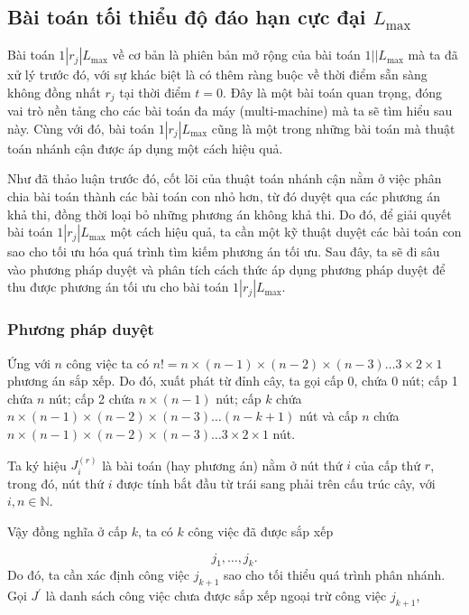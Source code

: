 \subsection{Bài toán tối thiểu độ đáo hạn cực đại $L_{\max}$}

Bài toán $1|r_j|L_{\max}$ về cơ bản là phiên bản mở rộng của bài toán $1||L_{\max}$ mà ta đã xử lý trước đó, với sự khác biệt là có thêm ràng buộc về thời điểm sẵn sàng không đồng nhất $r_j$ tại thời điểm $t=0$. Đây là một bài toán quan trọng, đóng vai trò nền tảng cho các bài toán đa máy (multi-machine) mà ta sẽ tìm hiểu sau này. Cùng với đó, bài toán $1|r_j|L_{\max}$ cũng là một trong những bài toán mà thuật toán nhánh cận được áp dụng một cách hiệu quả.

Như đã thảo luận trước đó, cốt lõi của thuật toán nhánh cận nằm ở việc phân chia bài toán thành các bài toán con nhỏ hơn, từ đó duyệt qua các phương án khả thi, đồng thời loại bỏ những phương án không khả thi. Do đó, để giải quyết bài toán $1|r_j|L_{\max}$ một cách hiệu quả, ta cần một kỹ thuật duyệt các bài toán con sao cho tối ưu hóa quá trình tìm kiếm phương án tối ưu. Sau đây, ta sẽ đi sâu vào phương pháp duyệt và phân tích cách thức áp dụng phương pháp duyệt để thu được phương án tối ưu cho bài toán $1|r_j|L_{\max}$.

\subsubsection*{Phương pháp duyệt}

Ứng với $n$ công việc ta có $n! = n \times (n-1) \times (n-2) \times (n-3) \ldots 3 \times 2 \times 1$ phương án sắp xếp. Do đó, xuất phát từ đỉnh cây, ta gọi cấp 0, chứa 0 nút; cấp 1 chứa $n$ nút; cấp 2 chứa $n \times (n-1)$ nút; cấp $k$ chứa $n \times (n-1) \times (n-2) \times (n-3) \ldots (n-k+1)$ nút và cấp $n$ chứa $n \times (n-1) \times (n-2) \times (n-3) \ldots 3 \times 2 \times 1$ nút.

\begin{cy}
Ta ký hiệu $J_i^{(r)}$ là bài toán (hay phương án) nằm ở nút thứ $i$ của cấp thứ $r$, trong đó, nút thứ $i$ được tính bắt đầu từ trái sang phải trên cấu trúc cây, với $i, n \in \mathbb{N}$.
\end{cy}

Vậy đồng nghĩa ở cấp $k$, ta có $k$ công việc đã được sắp xếp

\begin{equation*}
j_1,\ldots ,j_k.
\end{equation*}
Do đó, ta cần xác định công việc $j_{k+1}$ sao cho tối thiểu quá trình phân nhánh. Gọi $J^{'}$ là danh sách công việc chưa được sắp xếp ngoại trừ công việc $j_{k+1}$,

